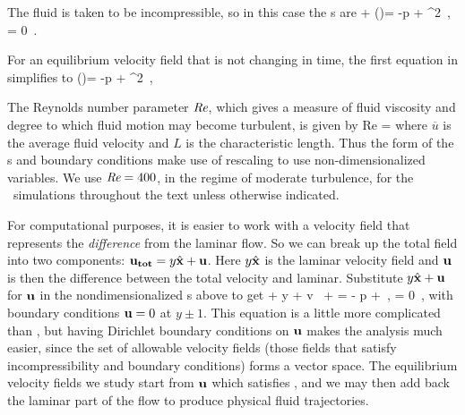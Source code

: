 \documentclass[lineno]{jfm}
\begin{document}
 The fluid is taken to be incompressible, so in this case the
 {\NSe}s are
 \beq
  + (\bu \cdot \nabla)\bu = -\nabla p +  \nabla^{2} \bu
    \,,\qquad
\nabla \cdot \bu  = 0 \,. \label{eqn:NavierStokes} \eeq 



For an equilibrium velocity field that is not changing in time, the first equation in
 simplifies to \beq
 (\bu \cdot \nabla)\bu = -\nabla p +  \nabla^{2} \bu
    \,,\qquad \label{eqn:NavierStokes2} \eeq
 
  The Reynolds number parameter $\textit{Re}$, which gives a measure of fluid viscosity and degree to which fluid motion may become turbulent, is given by \beq Re = 
\eeq where $\overline{u}$ is the average fluid velocity and $L$ is
the characteristic length. Thus the form of the {\NSe}s and boundary conditions make use of rescaling to use non-dimensionalized variables. 
We use $\textit{Re} = 400$, in the regime of moderate turbulence, for the \pCf\ simulations throughout the text unless otherwise indicated.

For computational purposes, it is easier to work with a velocity field  that
represents the {\em difference} from the laminar flow. 
So we can break up the total field into two components: ${\bf u_{tot}} =
y \hat{\bf x} + {\bf u}$. Here $y \hat{\bf x}$ is the laminar velocity
field and ${\bf u}$ is then the difference between the total velocity and
laminar. Substitute $y \hat{\bf x} + {\bf u}$ for ${\bf u}$ in the
nondimensionalized {\NSe}s above to get
\beq
    + y  
    + v \, 
    + \bu \cdot \bnabla \bu
=
    - \bnabla p
    + 
        \lapl \bu  \,, \quad \nabla \cdot \bu = 0
\,,
with boundary conditions ${\bf u} = 0 $ at $y \pm 1$.  This equation is 
a little more complicated than , but having 
Dirichlet boundary conditions on ${\bf u}$ makes the analysis much easier, 
since the set of allowable velocity fields (those fields that satisfy 
incompressibility and boundary conditions) forms a vector space. The equilibrium 
velocity fields we study start from ${\bf u}$ which satisfies , and we may then add back the laminar part of the flow to produce physical fluid trajectories. 
\end{document}
